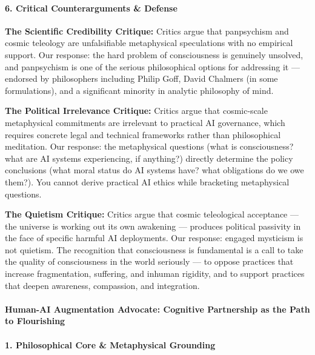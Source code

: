 \paragraph{6. Critical Counterarguments \&
Defense}\label{critical-counterarguments-defense-17}

\textbf{The Scientific Credibility Critique:} Critics argue that
panpsychism and cosmic teleology are unfalsifiable metaphysical
speculations with no empirical support. Our response: the hard problem
of consciousness is genuinely unsolved, and panpsychism is one of the
serious philosophical options for addressing it --- endorsed by
philosophers including Philip Goff, David Chalmers (in some
formulations), and a significant minority in analytic philosophy of
mind.

\textbf{The Political Irrelevance Critique:} Critics argue that
cosmic-scale metaphysical commitments are irrelevant to practical AI
governance, which requires concrete legal and technical frameworks
rather than philosophical meditation. Our response: the metaphysical
questions (what is consciousness? what are AI systems experiencing, if
anything?) directly determine the policy conclusions (what moral status
do AI systems have? what obligations do we owe them?). You cannot derive
practical AI ethics while bracketing metaphysical questions.

\textbf{The Quietism Critique:} Critics argue that cosmic teleological
acceptance --- the universe is working out its own awakening ---
produces political passivity in the face of specific harmful AI
deployments. Our response: engaged mysticism is not quietism. The
recognition that consciousness is fundamental is a call to take the
quality of consciousness in the world seriously --- to oppose practices
that increase fragmentation, suffering, and inhuman rigidity, and to
support practices that deepen awareness, compassion, and integration.

\paragraph{Human-AI Augmentation Advocate: Cognitive Partnership as the
Path to
Flourishing}\label{human-ai-augmentation-advocate-cognitive-partnership-as-the-path-to-flourishing}

\paragraph{1. Philosophical Core \& Metaphysical
Grounding}\label{philosophical-core-metaphysical-grounding-18}

